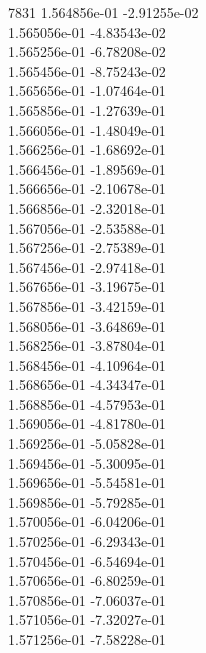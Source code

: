 7831	1.564856e-01	-2.91255e-02	\\ 	1.565056e-01	-4.83543e-02	\\ 	1.565256e-01	-6.78208e-02	\\ 	1.565456e-01	-8.75243e-02	\\ 	1.565656e-01	-1.07464e-01	\\ 	1.565856e-01	-1.27639e-01	\\ 	1.566056e-01	-1.48049e-01	\\ 	1.566256e-01	-1.68692e-01	\\ 	1.566456e-01	-1.89569e-01	\\ 	1.566656e-01	-2.10678e-01	\\ 	1.566856e-01	-2.32018e-01	\\ 	1.567056e-01	-2.53588e-01	\\ 	1.567256e-01	-2.75389e-01	\\ 	1.567456e-01	-2.97418e-01	\\ 	1.567656e-01	-3.19675e-01	\\ 	1.567856e-01	-3.42159e-01	\\ 	1.568056e-01	-3.64869e-01	\\ 	1.568256e-01	-3.87804e-01	\\ 	1.568456e-01	-4.10964e-01	\\ 	1.568656e-01	-4.34347e-01	\\ 	1.568856e-01	-4.57953e-01	\\ 	1.569056e-01	-4.81780e-01	\\ 	1.569256e-01	-5.05828e-01	\\ 	1.569456e-01	-5.30095e-01	\\ 	1.569656e-01	-5.54581e-01	\\ 	1.569856e-01	-5.79285e-01	\\ 	1.570056e-01	-6.04206e-01	\\ 	1.570256e-01	-6.29343e-01	\\ 	1.570456e-01	-6.54694e-01	\\ 	1.570656e-01	-6.80259e-01	\\ 	1.570856e-01	-7.06037e-01	\\ 	1.571056e-01	-7.32027e-01	\\ 	1.571256e-01	-7.58228e-01	\\ \hline
